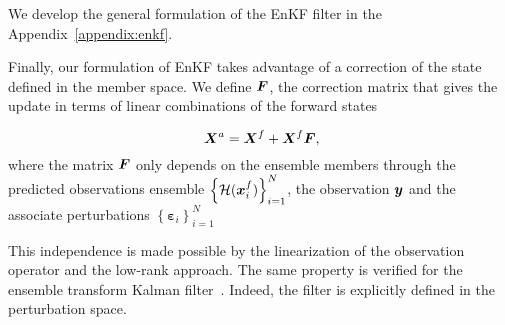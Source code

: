 We develop the general formulation of the EnKF filter in the Appendix~\ref{appendix:enkf}.

Finally, our formulation of EnKF takes advantage of a correction of the state defined in the member space. We define $\bm{F}$, the correction matrix that gives the update in terms of linear combinations of the forward states

\begin{equation}~\label{enkf_formula_Fcorr}
    \bm{X}^a = \bm{X}^f + \bm{X}^f \bm{F},
\end{equation}where the matrix $\bm{F}$ only depends on the ensemble members through the predicted observations ensemble $\left\{\mathcal{H}(\bm{x}_i^f) \right\}^N_{i=1}$, the observation $\bm{y}$ and the associate perturbations  $\left\{\bm{\varepsilon}_i \right\}^N_{i=1}$

This independence is made possible by the linearization of the observation operator and the low-rank approach. The same property is verified for the ensemble transform Kalman filter~\cite{bishop_adaptive_2001}. Indeed, the filter is explicitly defined in the perturbation space.